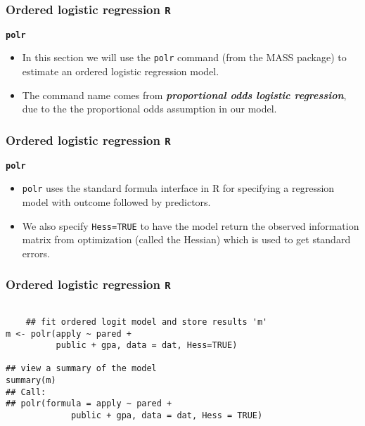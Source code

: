\documentclass[00-GLMregslides.tex]{subfiles}
\begin{document}
\newpage
\Large



\begin{frame}[fragile]
	\frametitle{Ordered logistic regression \texttt{R} }
	\Large
\textbf{\texttt{polr}}
\begin{itemize}
\item In this section we will use the \texttt{polr} command (from the MASS package) to estimate an ordered logistic 
regression model. 
\item The command name comes from \textbf{\textit{proportional odds logistic regression}}, due to the the proportional odds assumption in our model. 
\end{itemize}
\end{frame}
\begin{frame}[fragile]
	\frametitle{Ordered logistic regression \texttt{R} }
	\Large
\textbf{\texttt{polr}}
\begin{itemize}
\item \texttt{polr} uses the standard formula interface in R for specifying a regression model with outcome 
followed by predictors. 
\item We also specify \texttt{Hess=TRUE} to have the model return the observed information matrix from optimization (called the Hessian) which is used to get standard errors.
\end{itemize}
\end{frame}
\begin{frame}[fragile]
	\frametitle{Ordered logistic regression \texttt{R} }
	\large
\begin{framed}		
	\begin{verbatim}
	
	## fit ordered logit model and store results 'm'
m <- polr(apply ~ pared + 
          public + gpa, data = dat, Hess=TRUE)

## view a summary of the model
summary(m)
## Call:
## polr(formula = apply ~ pared + 
             public + gpa, data = dat, Hess = TRUE)
\end{verbatim}
\end{framed}
\end{frame}
\end{document}
